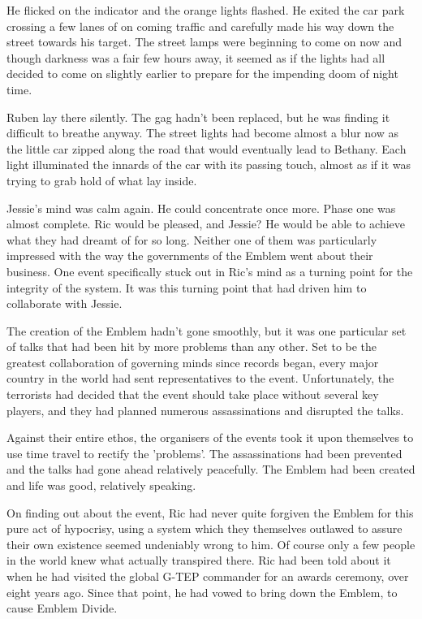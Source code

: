 He flicked on the indicator and the orange lights flashed.  He exited the car park crossing a few lanes of on coming traffic and carefully made his way down the street towards his target.  The street lamps were beginning to come on now and though darkness was a fair few hours away, it seemed as if the lights had all decided to come on slightly earlier to prepare for the impending doom of night time. 

Ruben lay there silently.  The gag hadn't been replaced, but he was finding it difficult to breathe anyway.  The street lights had become almost a blur now as the little car zipped along the road that would eventually lead to Bethany.  Each light illuminated the innards of the car with its passing touch, almost as if it was trying to grab hold of what lay inside.

Jessie's mind was calm again.  He could concentrate once more.  Phase one was almost complete.  Ric would be pleased, and Jessie?  He would be able to achieve what they had dreamt of for so long.  Neither one of them was particularly impressed with the way the governments of the Emblem went about their business.  One event specifically stuck out in Ric's mind as a turning point for the integrity of the system.  It was this turning point that had driven him to collaborate with Jessie.

The creation of the Emblem hadn't gone smoothly, but it was one particular set of talks that had been hit by more problems than any other.  Set to be the greatest collaboration of governing minds since records began, every major country in the world had sent representatives to the event.  Unfortunately, the terrorists had decided that the event should take place without several key players, and they had planned numerous assassinations and disrupted the talks.

Against their entire ethos, the organisers of the events took it upon themselves to use time travel to rectify the 'problems'.  The assassinations had been prevented and the talks had gone ahead relatively peacefully.  The Emblem had been created and life was good, relatively speaking.

On finding out about the event, Ric had never quite forgiven the Emblem for this pure act of hypocrisy, using a system which they themselves outlawed to assure their own existence seemed undeniably wrong to him.  Of course only a few people in the world knew what actually transpired there.  Ric had been told about it when he had visited the global G-TEP commander for an awards ceremony, over eight years ago.  Since that point, he had vowed to bring down the Emblem, to cause Emblem Divide.

